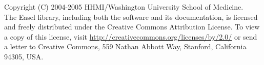 \vspace*{\fill}

\noindent 
Copyright (C) 2004-2005 HHMI/Washington University School of
Medicine.\\

\vspace{1.5em}
\noindent 
The Easel library, including both the software and its documentation,
is licensed and freely distributed under the Creative Commons
Attribution License.  To view a copy of this license, visit
\url{http://creativecommons.org/licenses/by/2.0/} or send a letter to
Creative Commons, 559 Nathan Abbott Way, Stanford, California 94305,
USA.


